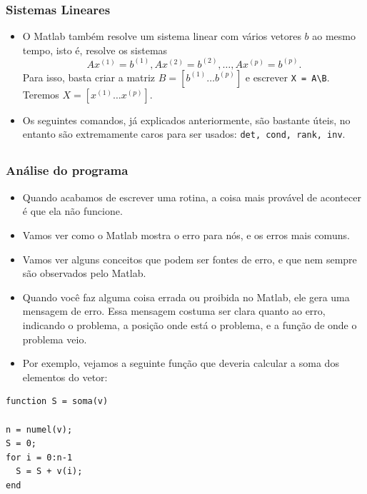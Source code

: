 \documentclass{beamer}
\newcommand{\ssiz}{\scriptsize}
\begin{document}
\begin{frame}[fragile]
\frametitle{Sistemas Lineares}

\begin{itemize}
\item<1-> O Matlab tamb\'em resolve um sistema linear com v\'arios vetores $b$
ao mesmo tempo, isto \'e, resolve os sistemas
$$Ax^{(1)} = b^{(1)}, Ax^{(2)} = b^{(2)}, \dots, Ax^{(p)} = b^{(p)}.$$
Para isso, basta criar a matriz $B = [b^{(1)} \dots b^{(p)}]$ e escrever
\verb+X = A\B+. Teremos $X = [x^{(1)} \dots x^{(p)}]$.
\item<2-> Os seguintes comandos, j\'a explicados anteriormente, s\~ao bastante
\'uteis, no entanto s\~ao extremamente caros para ser usados: {\tt det, cond,
rank, inv}.
\end{itemize}

\end{frame}

\subsection[An\'alise do programa]{}

\begin{frame}
\frametitle{An\'alise do programa}

\begin{itemize}
\item<1-> Quando acabamos de escrever uma rotina, a coisa mais prov\'avel de acontecer \'e que ela n\~ao funcione.
\item<2-> Vamos ver como o Matlab mostra o erro para n\'os, e os erros mais comuns.
\item<3-> Vamos ver alguns conceitos que podem ser fontes de erro, e que nem sempre s\~ao observados pelo Matlab.
\end{itemize}

\end{frame}

\begin{frame}[fragile]
\begin{itemize}
 \item<1-> Quando voc\^e faz alguma coisa errada ou proibida no Matlab, ele gera uma mensagem de erro. Essa mensagem costuma ser clara quanto ao erro, indicando o problema, a posi\c{c}\~ao onde est\'a o problema, e a fun\c{c}\~ao de onde o problema veio.
\item<2-> Por exemplo, vejamos a seguinte fun\c{c}\~ao que deveria calcular a soma dos elementos do vetor:
\end{itemize}
\pause \pause
{\ssiz
\begin{verbatim}
function S = soma(v)

n = numel(v);
S = 0;
for i = 0:n-1
  S = S + v(i);
end
\end{verbatim}
}

\end{frame}
\end{document}

